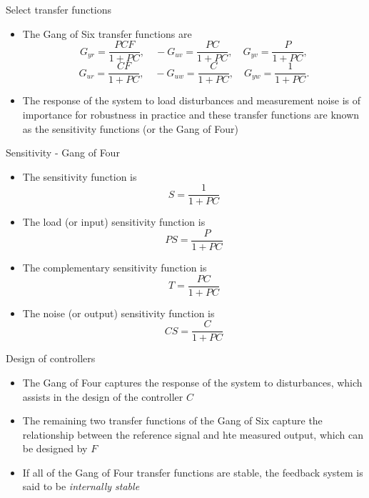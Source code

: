 \documentclass{beamer-control}
\begin{document}
\begin{frame}{Select transfer functions}
\begin{itemize}
\item The Gang of Six transfer functions are
\[ G_{yr} = \frac{PCF}{1+PC}, \quad -G_{uv} = \frac{PC}{1+PC}, \quad G_{yv} = \frac{P}{1+PC},\]
\[G_{ur} = \frac{CF}{1+PC}, \quad -G_{uw} = \frac{C}{1+PC}, \quad G_{yw} = \frac{1}{1+PC}.\]

\item The response of the system to load disturbances and measurement noise is of importance for robustness in practice and these transfer functions are known as the sensitivity functions (or the Gang of Four)
\end{itemize}
\end{frame}

\begin{frame}{Sensitivity - Gang of Four}
\begin{itemize}
	\item The sensitivity function is 
	\[S=\frac{1}{1+PC}\]
	\item The load (or input) sensitivity function is 
	\[PS=\frac{P}{1+PC}\]
	\item The complementary sensitivity function is 
	\[T=\frac{PC}{1+PC}\]
	\item The noise (or output) sensitivity function is
	\[CS = \frac{C}{1+PC}\]
\end{itemize}
\end{frame}

\begin{frame}{Design of controllers}
\begin{itemize}
	\item The Gang of Four captures the response of the system to disturbances, which assists in the design of the controller $C$
	\item The remaining two transfer functions of the Gang of Six capture the relationship between the reference signal and hte measured output, which can be designed by $F$
	\item If all of the Gang of Four transfer functions are stable, the feedback system is said to be \textit{internally stable}
\end{itemize}
\end{frame}
\end{document}
